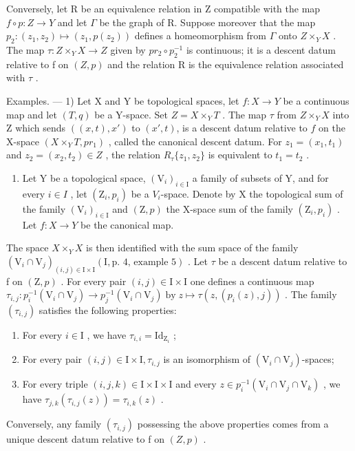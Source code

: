 Conversely, let R be an equivalence relation in Z compatible with the map \(f \circ p: Z \to Y\) and let \(\Gamma\) be the graph of R. Suppose moreover that the map \(p_{2}: (z_{1}, z_{2}) \mapsto (z_{1}, p(z_{2}))\) defines a homeomorphism from \(\Gamma\) onto \(Z \times_{Y} X\) . The map \(\tau: Z \times_{Y} X \to Z\) given by \(pr_{2} \circ p_{2}^{-1}\) is continuous; it is a descent datum relative to f on \((Z, p)\) and the relation R is the equivalence relation associated with \(\tau\) .

Examples. --- 1) Let X and Y be topological spaces, let \(f\colon X \to Y\) be a continuous map and let \((T,q)\) be a Y-space. Set \(Z = X \times_Y T\) . The map \(\tau\) from \(Z \times_Y X\) into Z which sends \(((x,t),x')\) to \((x',t)\), is a descent datum relative to \(f\) on the X-space \((X \times_Y T, pr_1)\) , called the canonical descent datum. For \(z_1 = (x_1, t_1)\) and \(z_2 = (x_2, t_2) \in Z\) , the relation \(R_{\tau}\{z_1, z_2\}\) is equivalent to \(t_1 = t_2\) .

\begin{enumerate}
\def\labelenumi{\arabic{enumi})}
\setcounter{enumi}{1}
\tightlist
\item
  Let Y be a topological space, \((\mathrm{V}_{i})_{i\in\mathrm{I}}\) a family of subsets of Y, and for every \(i\in I\) , let \((\mathrm{Z}_{i},p_{i})\) be a \(V_{i}\)-space. Denote by X the topological sum of the family \((\mathrm{V}_{i})_{i\in\mathrm{I}}\) and \((\mathrm{Z},p)\) the X-space sum of the family \((\mathrm{Z}_{i},p_{i})\) . Let \(f:X\to Y\) be the canonical map.
\end{enumerate}

The space \(X \times_{Y} X\) is then identified with the sum space of the family \((\mathrm{V}_{i} \cap \mathrm{V}_{j})_{(i,j) \in \mathrm{I} \times \mathrm{I}}(\mathrm{I}, \text{p.~4, example 5})\) . Let \(\tau\) be a descent datum relative to f on \((\mathrm{Z}, p)\) . For every pair \((i, j) \in \mathrm{I} \times \mathrm{I}\) one defines a continuous map \(\tau_{i,j}\colon p_{i}^{-1}(\mathrm{V}_{i}\cap\mathrm{V}_{j})\to p_{j}^{-1}(\mathrm{V}_{i}\cap\mathrm{V}_{j})\;\text{by}\;z\mapsto\tau(z,(p_{i}(z),j))\) . The family \((\tau_{i,j})\) satisfies the following properties:

\begin{enumerate}
\def\labelenumi{(\roman{enumi})}
\item
  For every \(i \in \mathrm{I}\) , we have \(\tau_{i,i} = \mathrm{Id}_{\mathrm{Z}_i}\) ;
\item
  For every pair \((i,j)\in \mathrm{I}\times \mathrm{I},\tau_{i,j}\) is an isomorphism of \((\mathrm{V}_i\cap \mathrm{V}_j)\)-spaces;
\item
  For every triple \((i,j,k)\in\mathrm{I}\times \mathrm{I}\times \mathrm{I}\) and every \(z\in p_i^{-1} (\mathrm{V}_i\cap \mathrm{V}_j\cap \mathrm{V}_k)\) , we have \(\tau_{j,k}(\tau_{i,j}(z)) = \tau_{i,k}(z)\) .
\end{enumerate}

Conversely, any family \((\tau_{i,j})\) possessing the above properties comes from a unique descent datum relative to f on \((Z,p)\) .

